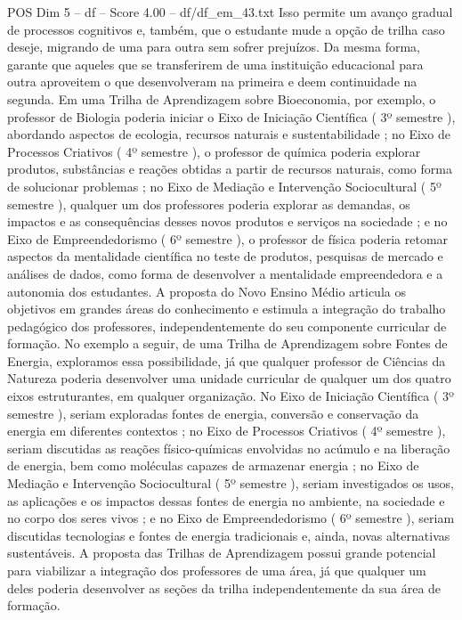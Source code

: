 \begin{textsample}{POS Dim 5 – df – Score 4.00 – df/df\_em\_43.txt}
Isso permite um avanço gradual de processos cognitivos e, também, que o estudante mude a opção de trilha caso deseje, migrando de uma para outra sem sofrer prejuízos.
Da mesma forma, garante que aqueles que se transferirem de uma instituição educacional para outra aproveitem o que desenvolveram na primeira e deem continuidade na segunda.
Em uma Trilha de Aprendizagem sobre Bioeconomia, por exemplo, o professor de Biologia poderia iniciar o Eixo de Iniciação Científica ( 3º semestre ), abordando aspectos de ecologia, recursos naturais e sustentabilidade ; no Eixo de Processos Criativos ( 4º semestre ), o professor de química poderia explorar produtos, substâncias e reações obtidas a partir de recursos naturais, como forma de solucionar problemas ; no Eixo de Mediação e Intervenção Sociocultural ( 5º semestre ), qualquer um dos professores poderia explorar as demandas, os impactos e as consequências desses novos produtos e serviços na sociedade ; e no Eixo de Empreendedorismo ( 6º semestre ), o professor de física poderia retomar aspectos da mentalidade científica no teste de produtos, pesquisas de mercado e análises de dados, como forma de desenvolver a mentalidade empreendedora e a autonomia dos estudantes.
A proposta do Novo Ensino Médio articula os objetivos em grandes áreas do conhecimento e estimula a integração do trabalho pedagógico dos professores, independentemente do seu componente curricular de formação.
No exemplo a seguir, de uma Trilha de Aprendizagem sobre Fontes de Energia, exploramos essa possibilidade, já que qualquer professor de Ciências da Natureza poderia desenvolver uma unidade curricular de qualquer um dos quatro eixos estruturantes, em qualquer organização.
No Eixo de Iniciação Científica ( 3º semestre ), seriam exploradas fontes de energia, conversão e conservação da energia em diferentes contextos ; no Eixo de Processos Criativos ( 4º semestre ), seriam discutidas as reações físico-químicas envolvidas no acúmulo e na liberação de energia, bem como moléculas capazes de armazenar energia ; no Eixo de Mediação e Intervenção Sociocultural ( 5º semestre ), seriam investigados os usos, as aplicações e os impactos dessas fontes de energia no ambiente, na sociedade e no corpo dos seres vivos ; e no Eixo de Empreendedorismo ( 6º semestre ), seriam discutidas tecnologias e fontes de energia tradicionais e, ainda, novas alternativas sustentáveis.
A proposta das Trilhas de Aprendizagem possui grande potencial para viabilizar a integração dos professores de uma área, já que qualquer um deles poderia desenvolver as seções da trilha independentemente da sua área de formação.

\end{textsample}

